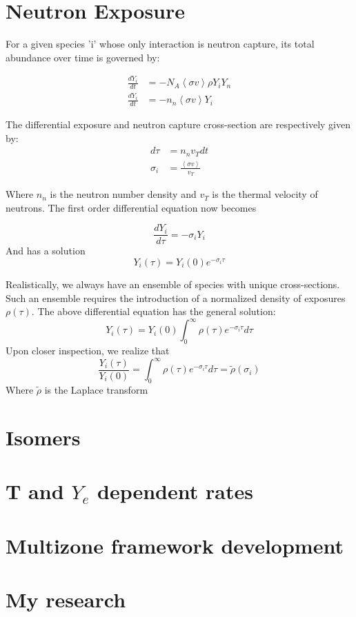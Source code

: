 \documentclass{article}
\begin{document}
\section*{Neutron Exposure}

For a given species 'i' whose only interaction is neutron capture, its total abundance over time is governed by:

\begin{align*}
    \frac{d Y_{i}}{dt} &= -N_{A}\left<\sigma v\right>\rho Y_{i}Y_{n}\\
    \frac{d Y_{i}}{dt} &= -n_{n} \left<\sigma v\right> Y_{i}
\end{align*}

The differential exposure and neutron capture cross-section are respectively given by:
\begin{align*}
    d\tau &= n_{n}v_{T}dt\\
    \sigma_{i} &= \frac{\left<\sigma v\right>}{v_{T}}
\end{align*}

Where $n_{n}$ is the neutron number density and $v_{T}$ is the thermal velocity of neutrons. The first order differential equation 
now becomes

\begin{equation*}
    \frac{d Y_{i}}{d\tau} = -\sigma_{i}Y_{i}
\end{equation*}
And has a solution
\begin{equation*}
    Y_{i}(\tau) = Y_{i}(0)e^{-\sigma_{i}\tau}
\end{equation*}

Realistically, we always have an ensemble of species with unique cross-sections. Such an ensemble requires the introduction  of a 
normalized density of exposures $\rho(\tau)$. The above differential equation has the general solution:
\begin{equation*}
    Y_{i}(\tau) = Y_i(0)\int_{0}^{\infty}\rho(\tau)e^{-\sigma_{i}\tau}d\tau
\end{equation*}
Upon closer inspection, we realize that
\begin{equation*}
    \frac{Y_{i}(\tau)}{Y_i(0)} = \int_{0}^{\infty}\rho(\tau)e^{-\sigma_{i}\tau}d\tau = \tilde{\rho}(\sigma_{i})
\end{equation*}
Where $\tilde{\rho}$ is the Laplace transform 
\section*{Isomers}
\section*{T and $Y_{e}$ dependent rates}
\section*{Multizone framework development}
\section*{My research}

\singlespacing



\end{document}
